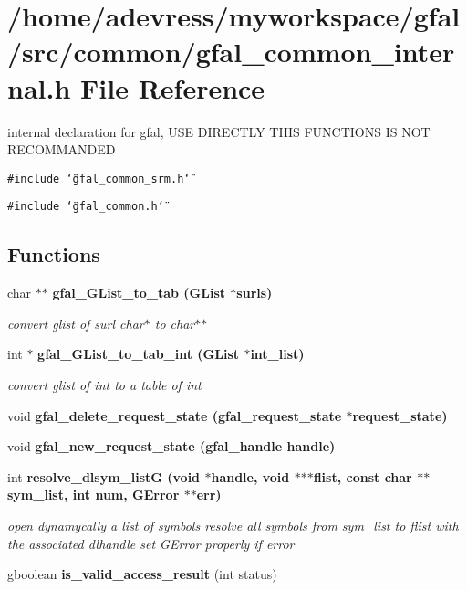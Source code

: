 \section{/home/adevress/myworkspace/gfal/src/common/gfal\_\-common\_\-internal.h File Reference}
\label{gfal__common__internal_8h}
internal declaration for gfal, USE DIRECTLY THIS FUNCTIONS IS NOT RECOMMANDED 

{\tt \#include \char`\"{}gfal\_\-common\_\-srm.h\char`\"{}}\par
{\tt \#include \char`\"{}gfal\_\-common.h\char`\"{}}\par
\subsection*{Functions}
\begin{CompactItemize}
\item 
char $\ast$$\ast$ \bf{gfal\_\-GList\_\-to\_\-tab} (GList $\ast$surls)
\begin{CompactList}\small\item\em convert glist of surl char$\ast$ to char$\ast$$\ast$ \item\end{CompactList}\item 
int $\ast$ \bf{gfal\_\-GList\_\-to\_\-tab\_\-int} (GList $\ast$int\_\-list)
\begin{CompactList}\small\item\em convert glist of int to a table of int \item\end{CompactList}\item 
void \bf{gfal\_\-delete\_\-request\_\-state} (\bf{gfal\_\-request\_\-state} $\ast$request\_\-state)
\item 
void \bf{gfal\_\-new\_\-request\_\-state} (gfal\_\-handle handle)
\item 
int \bf{resolve\_\-dlsym\_\-list\-G} (void $\ast$handle, void $\ast$$\ast$$\ast$flist, const char $\ast$$\ast$sym\_\-list, int num, GError $\ast$$\ast$err)\label{gfal__common__internal_8h_0323a4ab58106e316851c1ae06148e28}

\begin{CompactList}\small\item\em open dynamycally a list of symbols resolve all symbols from sym\_\-list to flist with the associated dlhandle set GError properly if error \item\end{CompactList}\item 
gboolean \textbf{is\_\-valid\_\-access\_\-result} (int status)\label{gfal__common__internal_8h_aed64917ebc1c60ab8ccd2c4dfbd2c3a}

\end{CompactItemize}


